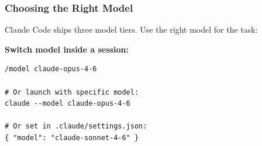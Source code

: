 \begin{frame}[fragile]\frametitle{Choosing the Right Model}
Claude Code ships three model tiers. Use the right model for the task:

\begin{center}
\end{center}

\textbf{Switch model inside a session:}
\begin{lstlisting}
/model claude-opus-4-6

# Or launch with specific model:
claude --model claude-opus-4-6

# Or set in .claude/settings.json:
{ "model": "claude-sonnet-4-6" }
\end{lstlisting}

\end{frame}



